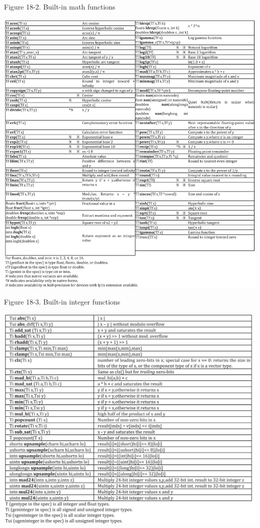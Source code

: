 \hspace*{\fill} \par %
Figure 18-2. Built-in math functions
\begin{center}
	\includegraphics[width=1.0\textwidth]{content/chapter-18/images/2}
\end{center}

\hspace*{\fill} \par %
Figure 18-3. Built-in integer functions
\begin{center}
	\includegraphics[width=1.0\textwidth]{content/chapter-18/images/3}
\end{center}

